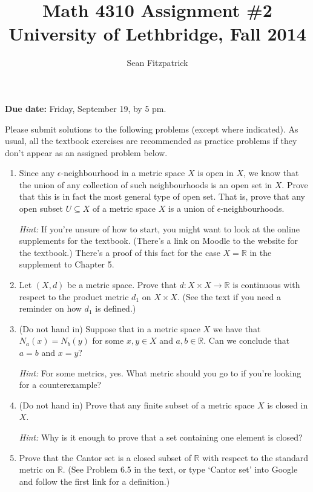 \documentclass[letterpaper,12pt]{article}
\title{Math 4310 Assignment \#2\\University of Lethbridge, Fall 2014}
\author{Sean Fitzpatrick}
\newcommand{\R}{\mathbb{R}}
\begin{document}
 \maketitle

{\bf Due date:} Friday, September 19, by 5 pm.

\bigskip

Please submit solutions to the following problems (except where indicated). As usual, all the textbook exercises are recommended as practice problems if they don't appear as an assigned problem below.

\begin{enumerate}
\item Since any $\epsilon$-neighbourhood in a metric space $X$ is open in $X$, we know that the union of any collection of such neighbourhoods is an open set in $X$. Prove that this is in fact the most general type of open set. That is, prove that any open subset $U\subseteq X$ of a metric space $X$ is a union of $\epsilon$-neighbourhoods.

{\em Hint:} If you're unsure of how to start, you might want to look at the online supplements for the textbook. (There's a link on Moodle to the website for the textbook.) There's a proof of this fact for the case $X=\R$ in the supplement to Chapter 5.

\item Let $(X,d)$ be a metric space. Prove that $d:X\times X\to \R$ is continuous with respect to the product metric $d_1$ on $X\times X$. (See the text if you need a reminder on how $d_1$ is defined.)

\item (Do not hand in) Suppose that in a metric space $X$ we have that $N_a(x) = N_b(y)$ for some $x,y\in X$ and $a,b\in\R$. Can we conclude that $a=b$ and $x=y$?

{\em Hint:} For some metrics, yes. What metric should you go to if you're looking for a counterexample?

\item (Do not hand in) Prove that any finite subset of a metric space $X$ is closed in $X$.

{\em Hint:} Why is it enough to prove that a set containing one element is closed?

\item Prove that the Cantor set is a closed subset of $\R$ with respect to the standard metric on $\R$. (See Problem 6.5 in the text, or type `Cantor set' into Google and follow the first link for a definition.)


\end{enumerate}
\end{document}
